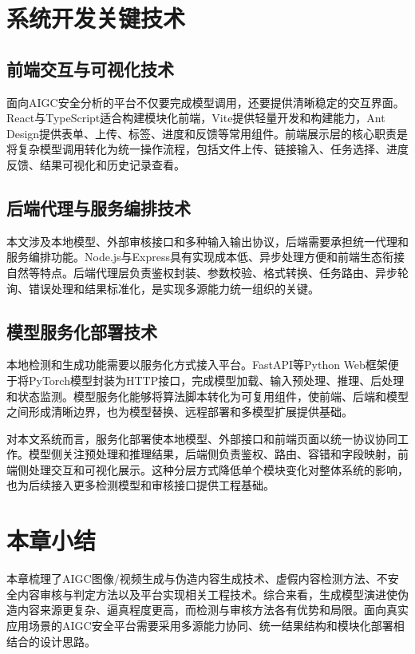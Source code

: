 \section{系统开发关键技术}

\subsection{前端交互与可视化技术}

面向AIGC安全分析的平台不仅要完成模型调用，还要提供清晰稳定的交互界面。React与TypeScript适合构建模块化前端，Vite提供轻量开发和构建能力，Ant Design提供表单、上传、标签、进度和反馈等常用组件。前端展示层的核心职责是将复杂模型调用转化为统一操作流程，包括文件上传、链接输入、任务选择、进度反馈、结果可视化和历史记录查看。

\subsection{后端代理与服务编排技术}

本文涉及本地模型、外部审核接口和多种输入输出协议，后端需要承担统一代理和服务编排功能。Node.js与Express具有实现成本低、异步处理方便和前端生态衔接自然等特点。后端代理层负责鉴权封装、参数校验、格式转换、任务路由、异步轮询、错误处理和结果标准化，是实现多源能力统一组织的关键。

\subsection{模型服务化部署技术}

本地检测和生成功能需要以服务化方式接入平台。FastAPI等Python Web框架便于将PyTorch模型封装为HTTP接口，完成模型加载、输入预处理、推理、后处理和状态监测。模型服务化能够将算法脚本转化为可复用组件，使前端、后端和模型之间形成清晰边界，也为模型替换、远程部署和多模型扩展提供基础。

对本文系统而言，服务化部署使本地模型、外部接口和前端页面以统一协议协同工作。模型侧关注预处理和推理结果，后端侧负责鉴权、路由、容错和字段映射，前端侧处理交互和可视化展示。这种分层方式降低单个模块变化对整体系统的影响，也为后续接入更多检测模型和审核接口提供工程基础。

\section{本章小结}

本章梳理了AIGC图像/视频生成与伪造内容生成技术、虚假内容检测方法、不安全内容审核与判定方法以及平台实现相关工程技术。综合来看，生成模型演进使伪造内容来源更复杂、逼真程度更高，而检测与审核方法各有优势和局限。面向真实应用场景的AIGC安全平台需要采用多源能力协同、统一结果结构和模块化部署相结合的设计思路。
